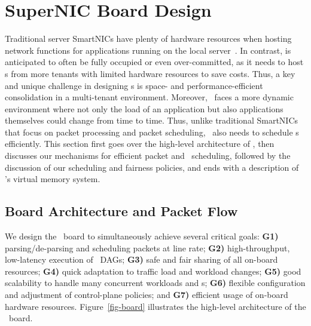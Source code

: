 

\section{SuperNIC Board Design}
\label{sec:design}

Traditional server SmartNICs have plenty of hardware resources when hosting network functions for applications running on the local server~\cite{SmartNIC-nsdi18,Caulfield-2018}.
In contrast, \snic{} is anticipated to often be fully occupied or even over-committed, as it needs to host \nt{}s from more tenants with limited hardware resources to save costs.
Thus, a key and unique challenge in designing \snic{}s is space- and performance-efficient consolidation in a multi-tenant environment.
Moreover, \snic\ faces a more dynamic environment where not only the load of an application but also applications themselves could change from time to time.
Thus, unlike traditional SmartNICs that focus on packet processing and packet scheduling, \snic\ also needs to schedule \nt{}s efficiently.
This section first goes over the high-level architecture of \snic, then discusses our mechanisms for efficient packet and \nt\ scheduling, followed by the discussion of our scheduling and fairness policies, and ends with a description of \snic's virtual memory system.

\subsection{Board Architecture and Packet Flow}

We design the \snic\ board to simultaneously achieve several critical goals:
\textbf{G1)} parsing/de-parsing and scheduling packets at line rate;
\textbf{G2)} high-throughput, low-latency execution of \nt\ DAGs;
\textbf{G3)} safe and fair sharing of all on-board resources;
\textbf{G4)} quick adaptation to traffic load and workload changes;
\textbf{G5)} good scalability to handle many concurrent workloads and \nt{}s;
\textbf{G6)} flexible configuration and adjustment of control-plane policies;
and \textbf{G7)} efficient usage of on-board hardware resources.
Figure~\ref{fig-board} illustrates the high-level architecture of the \snic\ board.

